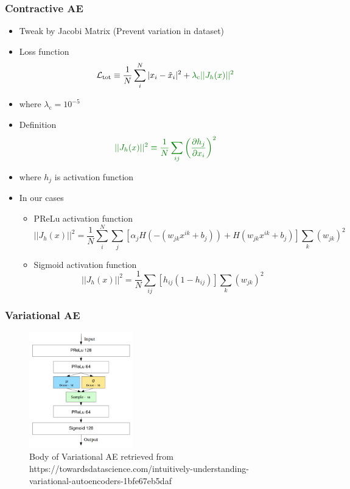 \subsubsection{Contractive AE}
\begin{itemize}
    \item Tweak by \textcolor[RGB]{0,128,0}{Jacobi Matrix (Prevent variation in dataset)}
    \item Loss function
    \begin{equation}
        \mathcal{L}_{\text{tot}} \equiv \frac{1}{N}\sum_i^N |x_i-\tilde{x}_i|^2 + \textcolor[RGB]{0,128,0}{\lambda_{\text{c}}||J_h(x)||^2}
    \end{equation}
    \item where $\lambda_{\text{c}} = 10^{-5}$
    \item Definition
    \begin{equation}
        \textcolor[RGB]{0,128,0}{||J_h(x)||^2 \equiv \frac{1}{N}\sum_{ij}\left(\frac{\partial h_j}{\partial x_i}\right)^2}
    \end{equation}
    \item where $h_j$ is activation function
    \item In our cases
    \begin{itemize}
        \item PReLu activation function
        \begin{equation}
            ||J_h(x)||^2 = \frac{1}{N}\sum_i^N\sum_j[\alpha_j H(-(w_{jk}x^{ik}+b_j)) + H(w_{jk}x^{ik}+b_j)]\sum_k(w_{jk})^2
        \end{equation}
        \item Sigmoid activation function
        \begin{equation}
            ||J_h(x)||^2 = \frac{1}{N}\sum_{ij}[h_{ij}(1-h_{ij})]\sum_k(w_{jk})^2
        \end{equation}
    \end{itemize}
\end{itemize}

\subsubsection{Variational AE}
\begin{figure}[h!]
    \centering
    \includegraphics[width=0.4\textwidth]{images/variational_ae.png}
    \caption{Body of Variational AE retrieved from https://towardsdatascience.com/intuitively-understanding-variational-autoencoders-1bfe67eb5daf}
    \label{fig:variational_ae}
\end{figure}

